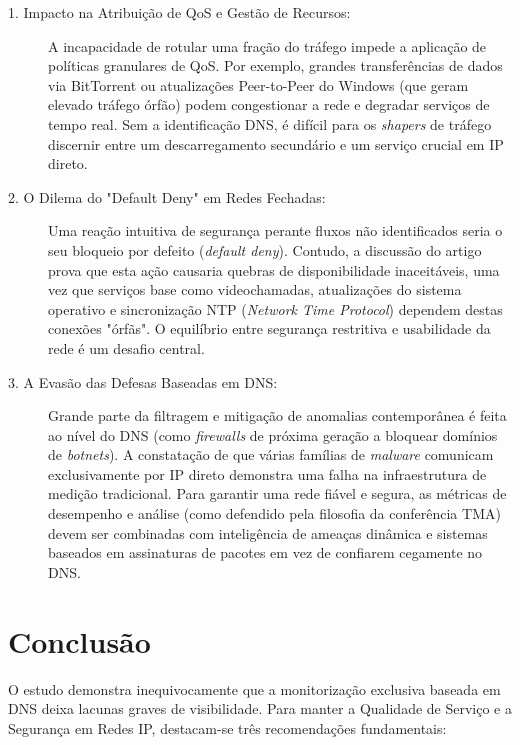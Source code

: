 \documentclass[11pt, a4paper]{article}
\begin{document}
\begin{description}
    \item[1. Impacto na Atribuição de QoS e Gestão de Recursos:] A incapacidade de rotular uma fração do tráfego impede a aplicação de políticas granulares de QoS. Por exemplo, grandes transferências de dados via BitTorrent ou atualizações Peer-to-Peer do Windows (que geram elevado tráfego órfão) podem congestionar a rede e degradar serviços de tempo real. Sem a identificação DNS, é difícil para os \textit{shapers} de tráfego discernir entre um descarregamento secundário e um serviço crucial em IP direto.
    
    \item[2. O Dilema do "Default Deny" em Redes Fechadas:] Uma reação intuitiva de segurança perante fluxos não identificados seria o seu bloqueio por defeito (\textit{default deny}). Contudo, a discussão do artigo prova que esta ação causaria quebras de disponibilidade inaceitáveis, uma vez que serviços base como videochamadas, atualizações do sistema operativo e sincronização NTP (\textit{Network Time Protocol}) dependem destas conexões "órfãs". O equilíbrio entre segurança restritiva e usabilidade da rede é um desafio central.
    
    \item[3. A Evasão das Defesas Baseadas em DNS:] Grande parte da filtragem e mitigação de anomalias contemporânea é feita ao nível do DNS (como \textit{firewalls} de próxima geração a bloquear domínios de \textit{botnets}). A constatação de que várias famílias de \textit{malware} comunicam exclusivamente por IP direto demonstra uma falha na infraestrutura de medição tradicional. Para garantir uma rede fiável e segura, as métricas de desempenho e análise (como defendido pela filosofia da conferência TMA) devem ser combinadas com inteligência de ameaças dinâmica e sistemas baseados em assinaturas de pacotes em vez de confiarem cegamente no DNS.
\end{description}

\section{Conclusão}

O estudo demonstra inequivocamente que a monitorização exclusiva baseada em DNS deixa lacunas graves de visibilidade. Para manter a Qualidade de Serviço e a Segurança em Redes IP, destacam-se três recomendações fundamentais: 
\end{document}
